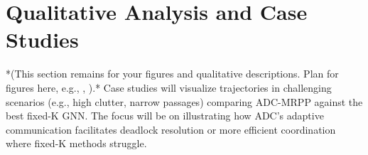 \begin{comment}
\begin{table}[htbp]
    \centering
    \caption{Generalization from 30\% Training Obstacles to Lower Test Densities (10x10 Map, 5 Robots)}
    \label{tab:gen_30D_to_low}
    \scriptsize
    \begin{tabular}{llccccc}
        \toprule
        Tested On & Model (Trained on 30\% Obst.) & SR \% & AM & FT & Avg. Inf. Time (ms) & Params \\
        \midrule
        \multirow{2}{*}{10\% Obstacles}
        & GCN (K=4, Best SR) & 0.7743 & 10.5508 & 61.5280 & 0.7270 & 64293 \\
        & ADC-FixedT & \textbf{0.8147} & 10.6861 & \textbf{56.7008} & 1.1504 & 39717 \\
        \midrule
        \multirow{2}{*}{20\% Obstacles}
        & GCN (K=2, Best SR) & 0.6135 & 10.8121 & 89.6217 & 0.6868 & 47909 \\
        & ADC-FixedT & \textbf{0.6531} & 11.2531 & \textbf{84.8929} & 1.1463 & 39717 \\
        \bottomrule
    \end{tabular}
\end{table}
When generalizing from 30\% training density to lower test densities (Table \ref{tab:gen_30D_to_low}), ADC-FixedT significantly outperforms the GCN baselines in SR and FT. This suggests that learning or setting an adaptive diffusion range can be very beneficial when the training distribution (high clutter) differs significantly from the test distribution (lower clutter).
\end{comment}

\section{Qualitative Analysis and Case Studies}
\label{sec:qualitative_analysis_detailed}
*(This section remains for your figures and qualitative descriptions. Plan for figures here, e.g., , ).*
Case studies will visualize trajectories in challenging scenarios (e.g., high clutter, narrow passages) comparing ADC-MRPP against the best fixed-K GNN. The focus will be on illustrating how ADC's adaptive communication facilitates deadlock resolution or more efficient coordination where fixed-K methods struggle.

\begin{comment}
\subsection{Analysis of Learned Diffusion Parameter $t$}
\label{subsec:learned_t_detailed}
*(This section remains for your analysis of learned 't' values. The `b.txt` file does not contain learned 't' values.)*
The average learned $t$ for the ADC-Main model (trained on TrainSet-10D-5R-10M) was approximately [Value based on your training logs]. This suggests a preference for a communication range that effectively incorporates information from [X-Y] hop neighbors with diminishing influence. *(Expand with histograms or plots of learned t values if available, or if t is learned per layer/channel.)*
\end{comment}

